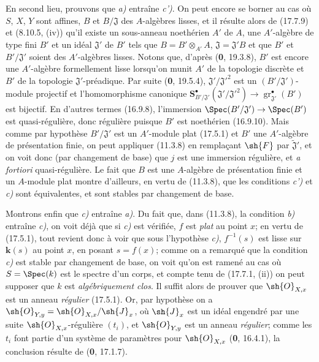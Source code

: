 En second lieu, prouvons que \emph{a)} entraîne \emph{c')}. On peut encore se borner au cas où $S$, $X$, $Y$ sont affines, $B$ et $B/\mathfrak J$ des $A$-algèbres lisses, et il résulte alors de (17.7.9) et (8.10.5, (iv)) qu'il existe un sous-anneau noethérien $A'$ de $A$, une $A'$-algèbre de type fini $B'$ et un idéal $\mathfrak J'$ de $B'$ tels que $B=B'\otimes_{A'}A$, $\mathfrak J=\mathfrak J'B$ et que $B'$ et $B'/\mathfrak J'$ soient des $A'$-algèbres lisses. Notons que, d'après (\textbf{0}, 19.3.8), $B'$ est encore une $A'$-algèbre formellement lisse lorsqu'on munit $A'$ de la topologie discrète et $B'$ de la topologie $\mathfrak J'$-préadique. Par suite (\textbf{0}, 19.5.4), $\mathfrak J'/\mathfrak J'^2$ est un $(B'/\mathfrak J')$-module projectif et l'homomorphisme canonique $\mathbf{S}^{\bullet}_{B'/\mathfrak J'}(\mathfrak J'/\mathfrak J'^2)\to\operatorname{gr}_{\mathfrak J'}^{\bullet}(B')$ est bijectif. En d'autres termes (16.9.8), l'immersion $\Spec(B'/\mathfrak J')\to\Spec(B')$ est quasi-régulière, donc régulière puisque $B'$ est noethérien (16.9.10). Mais comme par hypothèse $B'/\mathfrak J'$ est un $A'$-module plat (17.5.1) et $B'$ une $A'$-algèbre de présentation finie, on peut appliquer (11.3.8) en remplaçant $\sh{F}$ par $\widetilde{\mathfrak J}'$, et on voit donc (par changement de base) que $j$ est une immersion régulière, et \emph{a fortiori} quasi-régulière. Le fait que $B$ est une $A$-algèbre de présentation finie et un $A$-module plat montre d'ailleurs, en vertu de (11.3.8), que les conditions \emph{c')} et \emph{c)} sont équivalentes, et sont stables par changement de base.

Montrons enfin que \emph{c)} entraîne \emph{a)}. Du fait que, dans (11.3.8), la condition \emph{b)} entraîne \emph{c)}, on voit déjà que si \emph{c)} est vérifiée, $f$ est \emph{plat} au point $x$; en vertu de (17.5.1), tout revient donc à voir que sous l'hypothèse \emph{c)}, $f^{-1}(s)$ est lisse sur $\boldsymbol{k}(s)$ au point $x$, en posant $s=f(x)$; comme on a remarqué que la condition \emph{c)} est stable par changement de base, on voit qu'on est ramené au cas où $S=\Spec(k)$ est le spectre d'un corps, et compte tenu de (17.7.1, (ii)) on peut supposer que $k$ est \emph{algébriquement clos}. Il suffit alors de prouver que $\sh{O}_{X,x}$ est un anneau \emph{régulier} (17.5.1). Or, par hypothèse on a $\sh{O}_{Y,y}=\sh{O}_{X,x}/\sh{J}_x$, où $\sh{J}_x$ est un idéal engendré par une suite $\sh{O}_{X,x}$-régulière $(t_i)$, et $\sh{O}_{Y,y}$ est un anneau \emph{régulier}; comme les $t_i$ font partie d'un système de paramètres pour $\sh{O}_{X,x}$ (\textbf{0}, 16.4.1), la conclusion résulte de (\textbf{0}, 17.1.7).

